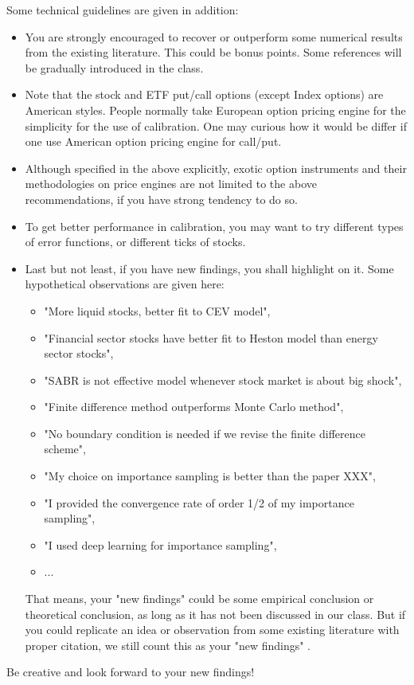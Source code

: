 \documentclass{article}
\begin{document}
Some technical guidelines are given in addition:
\begin{itemize}
 \item You are strongly 
 encouraged to recover or outperform 
 some numerical results from the existing literature. 
 This could be bonus points. Some references will be gradually
 introduced in the class.
 
 
\item Note that the stock and ETF put/call options (except Index options) are American styles. People normally take European option pricing engine for the simplicity  for the use of calibration. One may curious how it would be differ if one use American option pricing engine for call/put.



 \item Although specified in the above explicitly, 
 exotic option instruments and their methodologies on price engines are not limited to the above 
 recommendations, 
 if you have strong tendency to do so.
 
  
 \item To get better performance in calibration, you
may want to try different types of error functions, or different ticks of stocks. 

\item Last but not least, if you have new findings, you shall highlight on it. 
Some hypothetical observations are given here: 
\begin{itemize}
 \item "More liquid stocks, better fit to CEV model", 
 \item 
"Financial sector stocks have better fit to Heston model than energy sector stocks", 
\item 
"SABR is not effective model whenever stock market is about big shock", 
\item 
"Finite difference method outperforms Monte Carlo method",
\item 
"No boundary condition is needed if we revise the finite difference scheme", 
\item
"My choice on importance sampling is better than 
the paper XXX", 
\item 
"I provided the convergence rate of order 1/2 of my importance sampling",
\item 
"I used deep learning for importance sampling", 
\item ...
\end{itemize}





That means, your "new findings" could be some empirical conclusion 
or theoretical conclusion, as long as it has not been discussed in our class. 
But if you could replicate an idea or observation from some existing literature with proper citation, we still count this as your "new findings" .
\end{itemize}

Be creative and look forward to your new findings!



%
%
%
%
\end{document}
